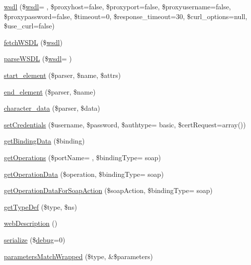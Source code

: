 \begin{DoxyCompactItemize}
\hyperlink{classwsdl_a5b4366809907087aa8d55a24472b310e}{wsdl} (\$\hyperlink{classwsdl}{wsdl}= \textquotesingle{}\textquotesingle{}, \$proxyhost=false, \$proxyport=false, \$proxyusername=false, \$proxypassword=false, \$timeout=0, \$response\+\_\+timeout=30, \$curl\+\_\+options=null, \$use\+\_\+curl=false)
\item 
\hyperlink{classwsdl_aa7cee5d5e5c547aa5bb471579bcc7a19}{fetch\+W\+S\+D\+L} (\$\hyperlink{classwsdl}{wsdl})
\item 
\hyperlink{classwsdl_aef0643f32c7dca703065cc3eb3fd1dba}{parse\+W\+S\+D\+L} (\$\hyperlink{classwsdl}{wsdl}= \textquotesingle{}\textquotesingle{})
\item 
\hyperlink{classwsdl_abf9dc4b028eeac08eeca4c7309a950e2}{start\+\_\+element} (\$parser, \$name, \$attrs)
\item 
\hyperlink{classwsdl_ad45367c512cbc2d4679d1a49db3802f2}{end\+\_\+element} (\$parser, \$name)
\item 
\hyperlink{classwsdl_a592a4f9b601cc33f15de0ad7a9c49ae5}{character\+\_\+data} (\$parser, \$data)
\item 
\hyperlink{classwsdl_ada213133d177c1c9c07435d65e89e735}{set\+Credentials} (\$username, \$password, \$authtype= \textquotesingle{}basic\textquotesingle{}, \$cert\+Request=array())
\item 
\hyperlink{classwsdl_ae6385888eeb57e98ef81323b05842341}{get\+Binding\+Data} (\$binding)
\item 
\hyperlink{classwsdl_aea628ff93cbcda102e27c3e5e77596ac}{get\+Operations} (\$port\+Name= \textquotesingle{}\textquotesingle{}, \$binding\+Type= \textquotesingle{}soap\textquotesingle{})
\item 
\hyperlink{classwsdl_a38f29f3212405560a4bcf188ad632e1f}{get\+Operation\+Data} (\$operation, \$binding\+Type= \textquotesingle{}soap\textquotesingle{})
\item 
\hyperlink{classwsdl_a5a538dc2c7da9f6f6d6880751318762b}{get\+Operation\+Data\+For\+Soap\+Action} (\$soap\+Action, \$binding\+Type= \textquotesingle{}soap\textquotesingle{})
\item 
\hyperlink{classwsdl_a327b3186f4e3c8b71431ce4a9db77e5a}{get\+Type\+Def} (\$type, \$ns)
\item 
\hyperlink{classwsdl_a43ffc8c82e99905b889fbeb93d4ca6eb}{web\+Description} ()
\item 
\hyperlink{classwsdl_a25fcce1ac19624739857406748ba332a}{serialize} (\$\hyperlink{classnusoap__base_ac652bd9010bd39b0f2854f7ded3f6f33}{debug}=0)
\item 
\hyperlink{classwsdl_a5ba30e743ac8f337a13eb915c4128904}{parameters\+Match\+Wrapped} (\$type, \&\$parameters)

\end{DoxyCompactItemize}
